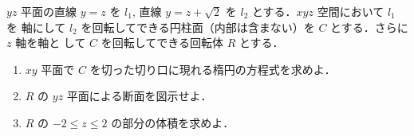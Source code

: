 \documentclass[a4paper,10pt]{ltjsarticle}
\begin{document}
\begin{oframed}
  $yz$ 平面の直線 $y=z$ を $l_1$, 直線 $y=z+\sqrt{2}$ を $l_2$ とする．$xyz$ 空間において $l_1$ を
  軸にして $l_2$ を回転してできる円柱面（内部は含まない）を $C$ とする．さらに $z$ 軸を軸と
  して $C$ を回転してできる回転体 $R$ とする．
  \begin{enumerate}
    \item $xy$ 平面で $C$ を切った切り口に現れる楕円の方程式を求めよ．
    \item $R$ の $yz$ 平面による断面を図示せよ．
    \item $R$ の $-2 \le z \le 2$ の部分の体積を求めよ．
  \end{enumerate}
\end{oframed}


\setlength{\columnseprule}{0.4pt}
\end{document}
